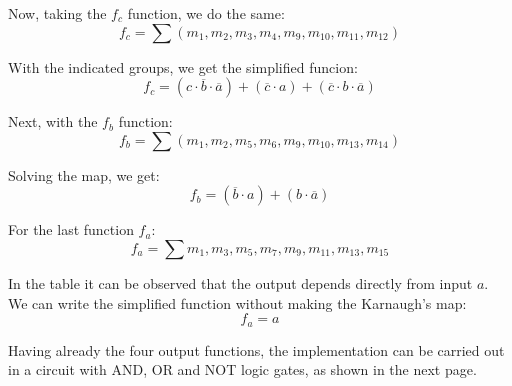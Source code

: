         Now, taking the $f_c$ function, we do the same:
        \[
            f_{c}=\sum{(m_1,m_2,m_3,m_4,m_9,m_{10},m_{11},m_{12})}
        \]
        \begin{centering}
            \begin{Karnaugh}
            \end{Karnaugh}
        \par\end{centering}
        With the indicated groups, we get the simplified funcion:
        \[
            \boxed{f_c=(c \cdot \overline{b} \cdot \overline{a})+
            (\overline{c} \cdot a)+
            (\overline{c} \cdot b \cdot \overline{a})}    
        \]\par
        Next, with the $f_b$ function:
        \[
            f_{b}=\sum{(m_1,m_2,m_5,m_6,m_9,m_{10},m_{13},m_{14})}    
        \]
        \begin{centering}
            \begin{Karnaugh}
            \end{Karnaugh}
        \par\end{centering}
        Solving the map, we get:
        \[
            \boxed{f_b=(\overline{b} \cdot a)+(b \cdot \overline{a})}    
        \]\par
        For the last function $f_a$:
        \[
            f_{a}=\sum{m_1,m_3,m_5,m_7,m_9,m_{11},m_{13},m_{15}}    
        \]\par
        In the table it can be observed that the output depends 
        directly from input $a$. We can write the simplified 
        function without making the Karnaugh's map:
        \[
            \boxed{f_a=a}    
        \]
        \par
        Having already the four output functions, the implementation
        can be carried out in a circuit with AND, OR and NOT logic gates,
        as shown in the next page.
       
